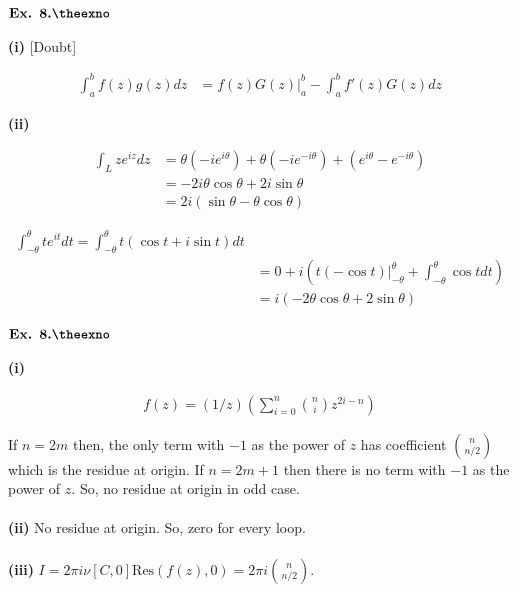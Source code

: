 \documentclass{article}
\def\tf{\textbf}
\newcounter{exno}
\begin{document}
\vspace{0.2in}

${\textbf{Ex. 8.\theexno}}$\addtocounter{exno}{1}

\tf{(i)} [Doubt]

\begin{align*}
    \int_{a}^{b} f(z)g(z)dz &= f(z)G(z)|_{a}^{b} - \int_{a}^{b}f'(z)G(z)dz
\end{align*}

\tf{(ii)}

\begin{align*}
    \int_{L} ze^{iz}dz &= \theta(-ie^{i\theta}) + \theta(-ie^{-i\theta}) + (e^{i\theta} - e^{-i\theta})\\
    &= -2i\theta\cos\theta + 2i\sin\theta\\
    &= 2i(\sin\theta-\theta\cos\theta)
\end{align*}

\begin{align*}
    \int_{-\theta}^{\theta}te^{it}dt = \int_{-\theta}^{\theta}t(\cos t +i\sin t)dt\\
    &= 0 + i(t(-\cos t)|_{-\theta}^{\theta} + \int_{-\theta}^{\theta}\cos tdt)\\
    &= i(-2\theta\cos\theta + 2\sin\theta)
\end{align*}

\vspace{0.2in}

${\textbf{Ex. 8.\theexno}}$\addtocounter{exno}{1}

\tf{(i)} 

\begin{align*}
    f(z) = (1/z)(\sum_{i=0}^{n}\binom{n}{i}z^{2i-n})
\end{align*}

If $n = 2m$ then, the only term with $-1$ as the power of $z$ has coefficient $\binom{n}{n/2}$ which is the residue at origin. If $n = 2m+1$ then there is no term with $-1$ as the power of $z$. So, no residue at origin in odd case.\\~\\

\tf{(ii)} No residue at origin. So, zero for every loop.\\~\\

\tf{(iii)} $I = 2\pi i \nu[C,0] \text{Res}(f(z),0) = 2\pi i \binom{n}{n/2}$.\\~\\
\end{document}
